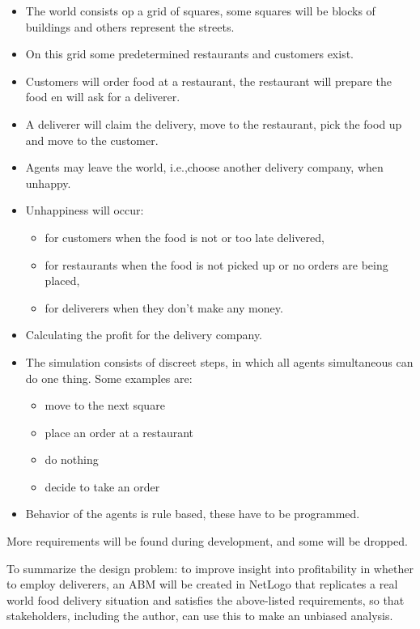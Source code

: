 \documentclass{article}
\begin{document}
    \begin{itemize}
        \item   The world consists op a grid of squares, some squares will be blocks of buildings and others represent the streets.
        \item   On this grid some predetermined restaurants and customers exist.
        \item   Customers will order food at a restaurant, the restaurant will prepare the food en will ask for a deliverer.
        \item   A deliverer will claim the delivery, move to the restaurant, pick the food up and move to the customer.
        \item   Agents may leave the world, i.e.,choose another delivery company, when unhappy.
        \item   Unhappiness will occur:
        \begin{itemize}
            \item   for customers when the food is not or too late delivered,
            \item   for restaurants when the food is not picked up or no orders are being placed,
            \item   for deliverers when they don't make any money.
        \end{itemize}
        \item    Calculating the profit for the delivery company.
        \item    The simulation consists of discreet steps, in which all agents simultaneous can do one thing.
        Some examples are:
        \begin{itemize}
            \item  move to the next square
            \item  place an order at a restaurant
            \item  do nothing
            \item  decide to take an order
        \end{itemize}
        \item   Behavior of the agents is rule based, these have to be programmed.
    \end{itemize}

    More requirements will be found during development, and some will be dropped.

    To summarize the design problem: to improve insight into profitability in whether to employ deliverers,
    an ABM will be created in NetLogo that replicates a real world food delivery situation and satisfies the above-listed requirements,
    so that stakeholders, including the author, can use this to make an unbiased analysis.
\end{document}
